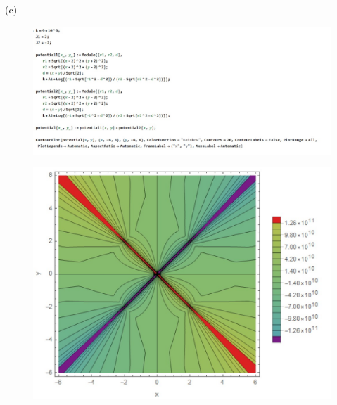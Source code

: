 \documentclass[journal,12pt,onecolumn]{IEEEtran}
\theoremstyle{remark}
\begin{document}
(c) \begin{figure}[H]
    \centering
     \includegraphics[scale=0.5]{figs/v3.1.jpeg}
    \caption{}    
    \label{fig:ishitha.em.fig1}
   \end{figure}   
   \begin{figure}[H]
    \centering
     \includegraphics[scale=0.5]{figs/v3.jpeg}
    \caption{}    
    \label{fig:ishitha.em.fig1}
   \end{figure}     
\end{document}

